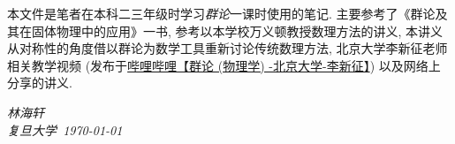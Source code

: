     本文件是笔者在本科二三年级时学习\emph{群论}一课时使用的笔记. 主要参考了《群论及其在固体物理中的应用》\cite{Xu1994}一书, 参考以本学校万义顿教授数理方法的讲义\cite{Wan2024}, 本讲义从对称性的角度借以群论为数学工具重新讨论传统数理方法, 北京大学李新征老师相关教学视频 (发布于\href{https://www.bilibili.com/video/BV1Ux4y177BH?vd_source=d630661fd733349495a9252445d0c4a4}{哔哩哔哩【群论 (物理学) -北京大学-李新征】}) 以及网络上分享的讲义.

    \vspace{2cm}
    \begin{flushright}
        \textit{林海轩} \\[1em]
        \textit{复旦大学\ \today}
    \end{flushright}
